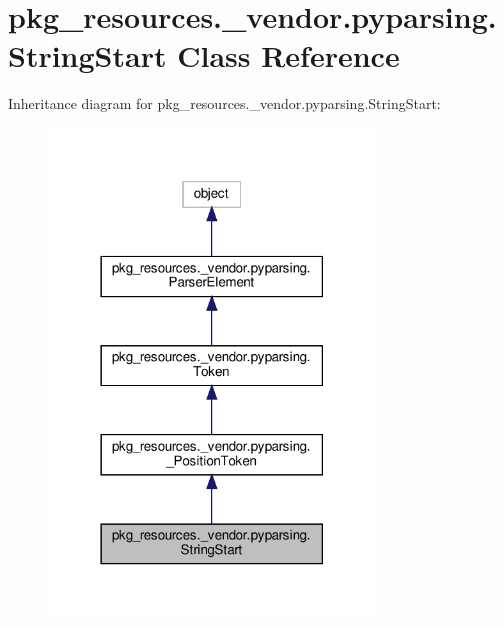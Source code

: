 \hypertarget{classpkg__resources_1_1__vendor_1_1pyparsing_1_1StringStart}{}\section{pkg\+\_\+resources.\+\_\+vendor.\+pyparsing.\+String\+Start Class Reference}
\label{classpkg__resources_1_1__vendor_1_1pyparsing_1_1StringStart}


Inheritance diagram for pkg\+\_\+resources.\+\_\+vendor.\+pyparsing.\+String\+Start\+:
\nopagebreak
\begin{figure}[H]
\begin{center}
\leavevmode
\includegraphics[width=246pt]{classpkg__resources_1_1__vendor_1_1pyparsing_1_1StringStart__inherit__graph}
\end{center}
\end{figure}


